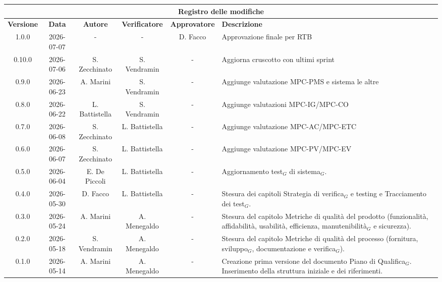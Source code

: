 \documentclass[a4paper, 10pt, colorlinks=true, linkcolor=black, urlcolor=blue, citecolor=blue, hidelinks]{article}
\begin{document}
\raggedbottom
\setlength{\emergencystretch}{2em}

\newcommand{\titolo}{Piano di Qualifica}
\newcommand{\dataverbale}{}
\newcommand{\dataversione}{2026-07-07}
\newcommand{\versione}{1.0.0}
\newcommand{\stato}{Approvato}
\newcommand{\destinatari}{The Bitless, prof. T. Vardanega, prof. R. Cardin, Zucchetti}
\def\templatedir{../../../templates}

\setcounter{secnumdepth}{5}
\setcounter{tocdepth}{5}

\begin{titlepage}

\end{titlepage}

\newpage
{}

\begingroup
\small
\renewcommand{\arraystretch}{1.25}
\setlength{\tabcolsep}{4pt}
\begin{longtable}{|c|c|c|c|c|p{3.5cm}|}
    \hline
    \multicolumn{6}{|c|}{\textbf{Registro delle modifiche}} \\
    \hline
    \textbf{Versione} & \textbf{Data} & \textbf{Autore} & \textbf{Verificatore} & \textbf{Approvatore} & \textbf{Descrizione} \\
    \hline
    \endhead
    1.0.0 & 2026-07-07 & - & - & D. Facco & Approvazione finale per RTB\\
    \hline
    0.10.0 & 2026-07-06 & S. Zecchinato & S. Vendramin & - & Aggiorna cruscotto con ultimi sprint \\
    \hline
    0.9.0 & 2026-06-23 & A. Marini & S. Vendramin & - & Aggiunge valutazione MPC-PMS e sistema le altre \\
    \hline
    0.8.0 & 2026-06-22 & L. Battistella & S. Vendramin & - & Aggiunge valutazioni MPC-IG/MPC-CO \\
    \hline
    0.7.0 & 2026-06-08 & S. Zecchinato & L. Battistella & - & Aggiunge valutazione MPC-AC/MPC-ETC \\ 
    \hline
    0.6.0 & 2026-06-07 & S. Zecchinato & L. Battistella & - & Aggiunge valutazione MPC-PV/MPC-EV \\
    \hline
    0.5.0 & 2026-06-04 & E. De Piccoli & L. Battistella & - & Aggiornamento test$_G$ di sistema$_G$. \\ 
    \hline
    0.4.0 & 2026-05-30 & D. Facco & L. Battistella & - & Stesura dei capitoli Strategia di verifica$_G$ e testing e Tracciamento dei test$_G$. \\
    \hline
    0.3.0 & 2026-05-24 & A. Marini & A. Menegaldo & - & Stesura del capitolo Metriche di qualità del prodotto (funzionalità, affidabilità, usabilità, efficienza, manutenibilità$_G$ e sicurezza). \\
    \hline
    0.2.0 & 2026-05-18 & S. Vendramin & A. Menegaldo & - & Stesura del capitolo Metriche di qualità del processo (fornitura, sviluppo$_G$, documentazione e verifica$_G$). \\
    \hline
    0.1.0 & 2026-05-14 & A. Marini & A. Menegaldo & - & Creazione prima versione del documento Piano di Qualifica$_G$. Inserimento della struttura iniziale e dei riferimenti. \\ \hline

\end{longtable}
\endgroup
\end{document}
